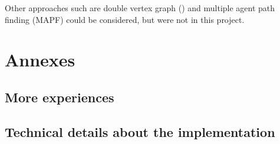 \documentclass[14pt,a4paper]{article}
\theoremstyle{definition}
\numberwithin{equation}{subsection}
\begin{document}
Other approaches such are double vertex graph (\cite{BachelorThesis}) and multiple agent path finding (MAPF) could be considered, but were not in this project.





\newpage
\section{Annexes}
\subsection{More experiences}
\subsection{Technical details about the implementation}


\newpage

 \nocite{*} 




\end{document}
